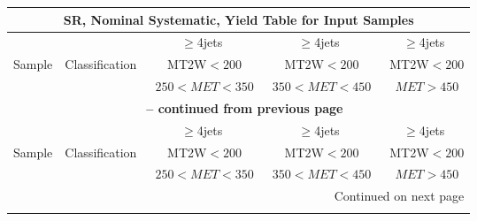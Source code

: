 \documentclass{article}
\begin{document}
 
 
 
 
\pagebreak 

 
 
 
 
\begin{longtable}{|l|c|c|c|c|} 
 
\multicolumn{5}{c}{ SR, Nominal Systematic, Yield Table for Input Samples }\\* \hline 
 &  & $\ge$4jets  & $\ge$4jets  & $\ge$4jets \\* 
Sample & Classification  & ~MT2W$<200$  & ~MT2W$<200$  & ~MT2W$<200$ \\* 
 &  & ~$250<MET<350$  & ~$350<MET<450$  & ~$MET>450$ \\* 
\hline \hline 
\endfirsthead 
 
\multicolumn{5}{c}{{\bfseries \tablename\ \thetable{} -- continued from previous page}}\\* \hline 
 &  & $\ge$4jets  & $\ge$4jets  & $\ge$4jets \\* 
Sample & Classification  & ~MT2W$<200$  & ~MT2W$<200$  & ~MT2W$<200$ \\* 
 &  & ~$250<MET<350$  & ~$350<MET<450$  & ~$MET>450$ \\* 
\hline \hline 
\endhead 
 
\multicolumn{5}{|r|}{{Continued on next page}}\\* \hline 
\endfoot 
 
 
\endlastfoot 
 

\end{longtable}
\end{document}
